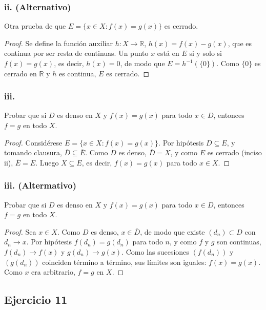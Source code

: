 \documentclass[11pt, a4paper]{article}
\begin{document}
\subsubsection*{ii. (Alternativo)}

Otra prueba de que $E = \{x \in X : f(x) = g(x)\}$ es cerrado.

\begin{proof}
Se define la función auxiliar $h: X \to \mathbb{R}$, $h(x) = f(x) - g(x)$, que es continua por ser
resta de continuas. Un punto $x$ está en $E$ si y solo si $f(x) = g(x)$, es decir, $h(x) = 0$, de modo
que $E = h^{-1}(\{0\})$. Como $\{0\}$ es cerrado en $\mathbb{R}$ y $h$ es continua, $E$ es cerrado.
\end{proof}

\subsubsection*{iii.}
Probar que si $D$ es denso en $X$ y $f(x) = g(x)$ para todo $x \in D$, entonces $f = g$ en todo $X$.

\begin{proof}
Considérese $E = \{x \in X : f(x) = g(x)\}$. Por hipótesis $D \subseteq E$, y tomando clausura,
$\overline{D} \subseteq \overline{E}$. Como $D$ es denso, $\overline{D} = X$, y como $E$ es cerrado
(inciso ii), $\overline{E} = E$. Luego $X \subseteq E$, es decir, $f(x) = g(x)$ para todo $x \in X$.
\end{proof}

\subsubsection*{iii. (Altermativo)}
Probar que si $D$ es denso en $X$ y $f(x) = g(x)$ para todo $x \in D$, entonces $f = g$ en todo $X$.

\begin{proof}
Sea $x \in X$. Como $D$ es denso, $x \in \overline{D}$, de modo que existe $(d_n) \subset D$ con
$d_n \to x$. Por hipótesis $f(d_n) = g(d_n)$ para todo $n$, y como $f$ y $g$ son continuas,
$f(d_n) \to f(x)$ y $g(d_n) \to g(x)$. Como las sucesiones $(f(d_n))$ y $(g(d_n))$ coinciden término
a término, sus límites son iguales: $f(x) = g(x)$. Como $x$ era arbitrario, $f = g$ en $X$.
\end{proof}

\subsection*{Ejercicio 11}
\end{document}
